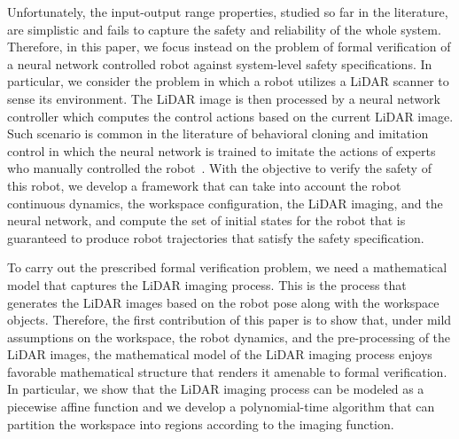 




Unfortunately, the input-output range properties, studied so far in the literature, are simplistic and fails to capture the safety and reliability of the whole system. Therefore, in this paper, we focus instead on the problem of formal verification of a neural network controlled robot against system-level safety specifications. In particular, we consider the problem in which a robot utilizes a LiDAR scanner to sense its environment. The LiDAR image is then processed by a neural network controller which computes the control actions based on the current LiDAR image. Such scenario is common in the literature of behavioral cloning and imitation control in which the neural network is trained to imitate the actions of experts who manually controlled the robot~\r{\cite{??}}. With the objective to verify the safety of this robot, we develop a framework that can take into account the robot continuous dynamics, the workspace configuration, the LiDAR imaging, and the neural network, and compute the set of initial states for the robot that is guaranteed to produce robot trajectories that satisfy the safety specification.


To carry out the prescribed formal verification problem, we need a mathematical model that captures the LiDAR imaging process. This is the process that generates the LiDAR images based on the robot pose along with the workspace objects.  Therefore, the first contribution of this paper is to show that, under mild assumptions on the workspace, the robot dynamics, and the pre-processing of the LiDAR images, the mathematical model of the LiDAR imaging process enjoys favorable mathematical structure that renders it amenable to formal verification. In particular, we show that the LiDAR imaging process can be modeled as a piecewise affine function and we develop a polynomial-time algorithm that can partition the workspace into regions according to the imaging function.

